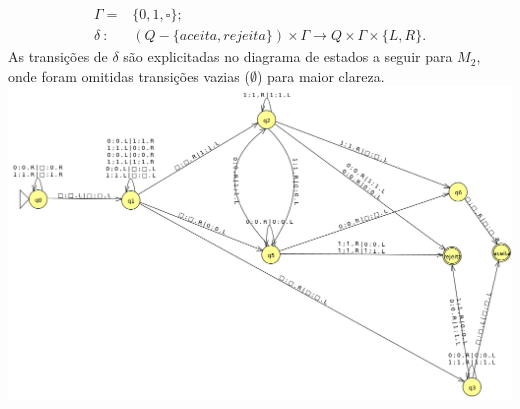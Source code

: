 \documentclass{homework}
\begin{document}
\begin{itemize}
\begin{align*}
			\Gamma = & \{0,1,\square\};\\
			\delta\ :\ & (Q - \{aceita,rejeita\}) \times \Gamma \rightarrow Q \times \Gamma \times \{L,R\}.
		\end{align*}
		As transições de $\delta$ são explicitadas no diagrama de estados a seguir para $M_2$, onde foram omitidas transições vazias ($\emptyset$) para maior clareza.\\
		\includegraphics[scale=.4]{"images/L7E6-2"}

\pagebreak		
		

\end{itemize}
\end{document}
